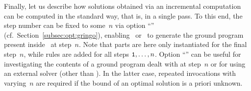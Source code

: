 Finally, let us describe how solutions obtained via an incremental computation
can be computed in the standard way, that is, in a single pass.
To this end, the step number can be fixed to some~$n$ via
option ``'' (cf.\ Section~\ref{subsec:opt:gringo}),
enabling \gringo\ or \clingo\ to generate the ground program present
inside \iclingo\ at step~$n$.
Note that  parts are here only instantiated for the final step~$n$,
while  rules are added for all steps $\texttt{1},\dots,n$.
Option ``'' can be useful for investigating the contents
of a ground program dealt with at step~$n$ or for using an external solver
(other than \clasp).
In the latter case, repeated invocations with varying~$n$
are required if the bound of an optimal solution is a priori unknown.


